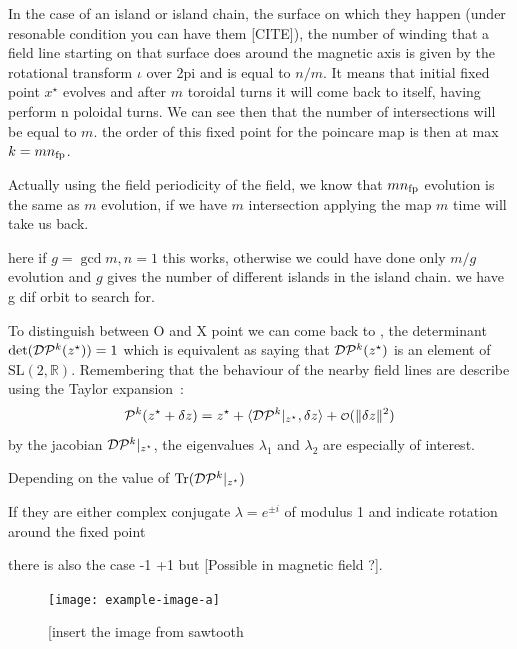 In the case of an island or island chain, the surface on which they happen (under resonable condition you can have them [CITE]), the number of winding that a field line starting on that surface does around the magnetic axis is given by the rotational transform $\iota$ over 2pi and is equal to $n/m$. It means that initial fixed point $x^\star$ evolves and after $m$ toroidal turns it will come back to itself, having perform n poloidal turns. We can see then that the number of intersections will be equal to $m$. the order of this fixed point for the poincare map is then at max $k=mn_\text{fp}$.

\begin{figure}[H]
    \hfill
    \caption{}
\end{figure}

Actually using the field periodicity of the field, we know that $mn_\text{fp}$ evolution is the same as $m$ evolution, if we have $m$ intersection applying the map $m$ time will take us back.

here if $g = \gcd{m,n} = 1$ this works, otherwise we could have done only $m/g$ evolution and $g$ gives the number of different islands in the island chain.
we have g dif orbit to search for.

To distinguish between O and X point we can come back to , the determinant $\text{det}(\mathcal{D}\mathcal{P}^k(z^\star)) = 1$ which is equivalent as saying that $\mathcal{D}\mathcal{P}^k(z^\star)$ is an element of $\text{SL}(2,\mathbb{R})$. Remembering that the behaviour of the nearby field lines are describe using the Taylor expansion~:
\begin{equation*}
    \pmap^k(\z^\star+\delta \z) = \z^\star + \langle\dpmap^k\vert_{\z^\star}, \delta\z\rangle + \smallO(\Vert\delta\z\Vert^2)
\end{equation*}
by the jacobian $\mathcal{D}\mathcal{P}^k\vert_{z^\star}$, the eigenvalues $\lambda_1$ and $\lambda_2$ are especially of interest.

Depending on the value of $\text{Tr}(\mathcal{D}\mathcal{P}^k\vert_{z^\star})$

If they are either complex conjugate $\lambda = e^{\pm i}$ of modulus 1 and indicate rotation around the fixed point


there is also the case -1 +1 but 
[Possible in magnetic field ?].

\begin{figure}[H]
    \centering
    \texttt{[image: example-image-a]}
    \caption{[insert the image from sawtooth}
    \label{fig:enter-label}
\end{figure}

